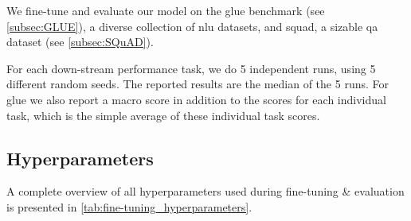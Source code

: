 We fine-tune and evaluate our model on the \gls{glue} benchmark (see \cref{subsec:GLUE}), a diverse collection of \gls{nlu} datasets, and \gls{squad}, a sizable \gls{qa} dataset (see \cref{subsec:SQuAD}).

For each down-stream performance task, we do 5 independent runs, using 5 different random seeds. The reported results are the median of the 5 runs. For \gls{glue} we also report a macro score in addition to the scores for each individual task, which is the simple average of these individual task scores.

\subsection{Hyperparameters}
\label{subsec:hyperparameters_evaluation}
A complete overview of all hyperparameters used during fine-tuning \& evaluation is presented in \cref{tab:fine-tuning_hyperparameters}.

